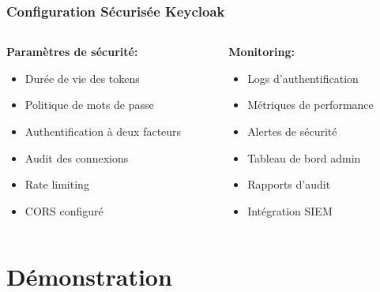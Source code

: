 \documentclass[aspectratio=169]{beamer}
\begin{document}
\begin{frame}
    \frametitle{Configuration Sécurisée Keycloak}
    \begin{columns}
        \begin{column}{0.5\textwidth}
            \textbf{Paramètres de sécurité:}
            \begin{itemize}
                \item Durée de vie des tokens
                \item Politique de mots de passe
                \item Authentification à deux facteurs
                \item Audit des connexions
                \item Rate limiting
                \item CORS configuré
            \end{itemize}
        \end{column}
        \begin{column}{0.5\textwidth}
            \textbf{Monitoring:}
            \begin{itemize}
                \item Logs d'authentification
                \item Métriques de performance
                \item Alertes de sécurité
                \item Tableau de bord admin
                \item Rapports d'audit
                \item Intégration SIEM
            \end{itemize}
        \end{column}
    \end{columns}
\end{frame}

\section{Démonstration}
\end{document}
